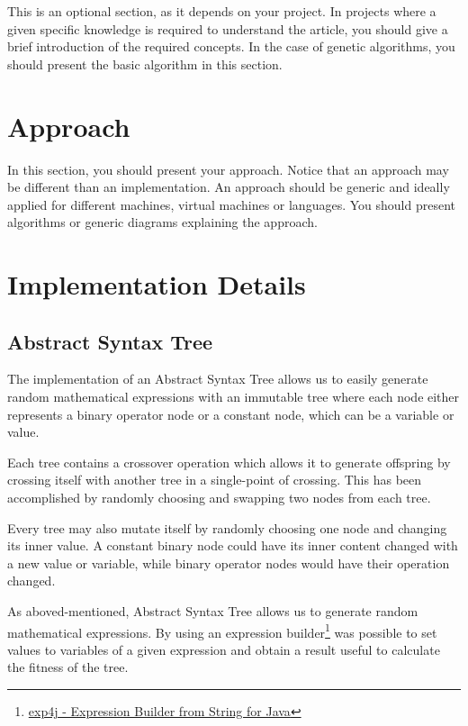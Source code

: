 \documentclass[runningheads]{llncs}
\begin{document}
This is an optional section, as it depends on your project. In projects where a given specific knowledge is required to understand the article, you should give a brief introduction of the required concepts. In the case of genetic algorithms, you should present the basic algorithm in this section.

\section{Approach}

In this section, you should present your approach. Notice that an approach may be different than an implementation. An approach should be generic and ideally applied for different machines, virtual machines or languages. You should present algorithms or generic diagrams explaining the approach.

\section{Implementation Details}

\subsection{Abstract Syntax Tree}
The implementation of an Abstract Syntax Tree allows us to easily generate random mathematical expressions with an immutable tree where each node either represents a binary operator node or a constant node, which can be a variable or value.

Each tree contains a crossover operation which allows it to generate offspring by crossing itself with another tree in a single-point of crossing. This has been accomplished by randomly choosing and swapping two nodes from each tree.

Every tree may also mutate itself by randomly choosing one node and changing its inner value. A constant binary node could have its inner content changed with a new value or variable, while binary operator nodes would have their operation changed.

As aboved-mentioned, Abstract Syntax Tree allows us to generate random mathematical expressions. By using an expression builder\footnote{\href{https://www.objecthunter.net/exp4j/index.htm}{exp4j - Expression Builder from String for Java}} was possible to set values to variables of a given expression and obtain a result useful to calculate the fitness of the tree.
\end{document}
